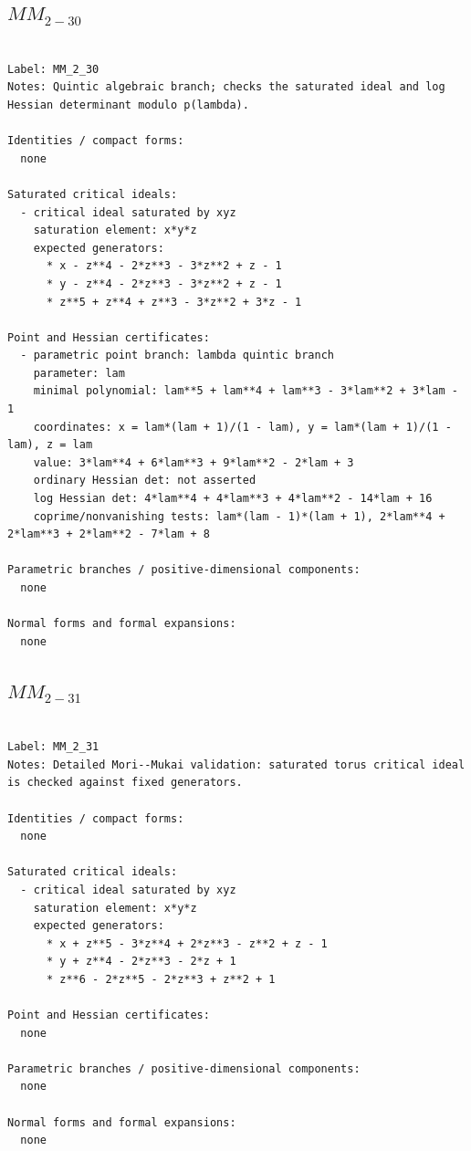 \documentclass[10pt,a4paper]{article}
\begin{document}
\subsection*{$ MM_{2-30} $}

\begin{lstlisting}

Label: MM_2_30
Notes: Quintic algebraic branch; checks the saturated ideal and log Hessian determinant modulo p(lambda).

Identities / compact forms:
  none

Saturated critical ideals:
  - critical ideal saturated by xyz
    saturation element: x*y*z
    expected generators:
      * x - z**4 - 2*z**3 - 3*z**2 + z - 1
      * y - z**4 - 2*z**3 - 3*z**2 + z - 1
      * z**5 + z**4 + z**3 - 3*z**2 + 3*z - 1

Point and Hessian certificates:
  - parametric point branch: lambda quintic branch
    parameter: lam
    minimal polynomial: lam**5 + lam**4 + lam**3 - 3*lam**2 + 3*lam - 1
    coordinates: x = lam*(lam + 1)/(1 - lam), y = lam*(lam + 1)/(1 - lam), z = lam
    value: 3*lam**4 + 6*lam**3 + 9*lam**2 - 2*lam + 3
    ordinary Hessian det: not asserted
    log Hessian det: 4*lam**4 + 4*lam**3 + 4*lam**2 - 14*lam + 16
    coprime/nonvanishing tests: lam*(lam - 1)*(lam + 1), 2*lam**4 + 2*lam**3 + 2*lam**2 - 7*lam + 8

Parametric branches / positive-dimensional components:
  none

Normal forms and formal expansions:
  none

\end{lstlisting}

\subsection*{$ MM_{2-31} $}

\begin{lstlisting}

Label: MM_2_31
Notes: Detailed Mori--Mukai validation: saturated torus critical ideal is checked against fixed generators.

Identities / compact forms:
  none

Saturated critical ideals:
  - critical ideal saturated by xyz
    saturation element: x*y*z
    expected generators:
      * x + z**5 - 3*z**4 + 2*z**3 - z**2 + z - 1
      * y + z**4 - 2*z**3 - 2*z + 1
      * z**6 - 2*z**5 - 2*z**3 + z**2 + 1

Point and Hessian certificates:
  none

Parametric branches / positive-dimensional components:
  none

Normal forms and formal expansions:
  none

\end{lstlisting}
\end{document}
